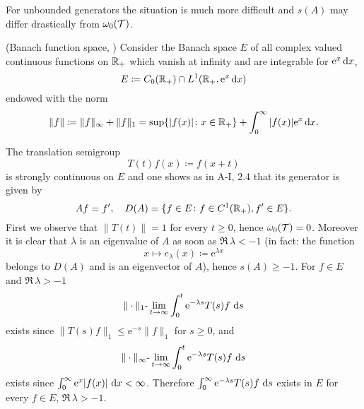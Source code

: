 For unbounded generators the situation is much more difficult and $s(A)$ may differ drastically from $\omega_{0}(\mathcal{T})$.
\begin{example}\label{ex:a3-1.3}(Banach function space, \citet{greinervoigtwolff:1981})
Consider the Banach space $E$ of all complex valued continuous functions on $\mathbb{R}_{+}$ which vanish at infinity and are integrable for $\mathrm{e}^{x}\mathop{}\!\mathrm{d}{x}$, \ie 
\[
    E \coloneqq C_{0}(\mathbb{R}_{+}) \cap L^{1}(\mathbb{R}_{+}, \mathrm{e}^{x}\mathop{}\!\mathrm{d}{x})
\]
endowed with the norm
\[
    \|f\| \coloneqq \|f\|_{\infty} + \|f\|_{1} = \sup\{|f(x)| \colon x \in \mathbb{R}_{+}\} + \int_{0}^{\infty} |f(x)|\mathrm{e}^{x} \mathop{}\!\mathrm{d}{x} .
\]
\end{example}
The translation semigroup
\[
    T(t)f(x) \coloneqq f(x+t)
\]
is strongly continuous on $E$ and one shows as in A-I, 2.4 that its generator is given by
\[
    Af = f', \quad D(A) = \{ f \in E \colon f \in C^{1}(\mathbb{R}_{+}), f' \in E \} .
\]
First we observe that $\|T(t)\| = 1$ for every $t \geq 0$, hence $\omega_{0}(\mathcal{T}) = 0$.
Moreover it is clear that $\lambda$ is an eigenvalue of $A$ as soon as $\Re\,\lambda < -1$ (in fact: the function
\[
    x \mapsto e_{\lambda}(x) \coloneqq \mathrm{e}^{\lambda x}
\]
belongs to $D(A)$ and is an eigenvector of $A$), hence $s(A) \geq -1$.
For $f \in E$ and $\Re \, \lambda > -1$ 
\[
    \|\cdot\|_{1}\text{-}\lim_{t \to \infty} \int_{0}^{t} \mathrm{e}^{-\lambda s}T(s)f \, \mathop{}\!\mathrm{d}{s}
\]
exists since $\|T(s)f\|_{1} \leq \mathrm{e}^{-s}\|f\|_{1}$ for $s \geq 0$, and
\[
    \|\cdot\|_{\infty}\text{-}\lim_{t \to \infty} \int_{0}^{t} \mathrm{e}^{-\lambda s}T(s)f \, \mathop{}\!\mathrm{d}{s}
\]
exists since $\int_{0}^{\infty} \mathrm{e}^{x}|f(x)| \, \mathop{}\!\mathrm{d}{x} < \infty$.
Therefore $\int_{0}^{\infty} \mathrm{e}^{-\lambda s}T(s)f \, \mathop{}\!\mathrm{d}{s}$ exists in $E$ for every $f \in E$, $\Re\,\lambda > -1$.

